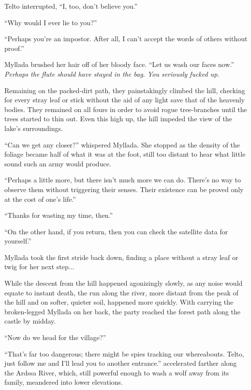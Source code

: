 Telto interrupted, ``I, too, don't believe you.''

``Why would I ever lie to you?''

``Perhaps you're an impostor. After all, I can't accept the words of others without proof.''

Myllada brushed her hair off of her bloody face. ``Let us wash our faces now.'' \emph{Perhaps the flute should have stayed in the bag. You seriously fucked up.}

\centeredstars

Remaining on the packed-dirt path, they painstakingly climbed the hill, checking for every stray leaf or stick without the aid of any light save that of the heavenly bodies. They remained on all fours in order to avoid rogue tree-branches until the trees started to thin out. Even this high up, the hill impeded the view of the lake's surroundings.

``Can we get any closer?'' whispered Myllada. She stopped as the density of the foliage became half of what it was at the foot, still too distant to hear what little sound such an army would produce.

``Perhaps a little more, but there isn't much more we can do. There's no way to observe them without triggering their senses. Their existence can be proved only at the cost of one's life.''

``Thanks for wasting my time, then.''

``On the other hand, if you return, then you can check the satellite data for yourself.''

Myllada took the first stride back down, finding a place without a stray leaf or twig for her next step...

\centeredstars

While the descent from the hill happened agonizingly slowly, as any noise would equate to instant death, the run along the river, more distant from the peak of the hill and on softer, quieter soil, happened more quickly. With \yronsyncra{} carrying the broken-legged Myllada on her back, the party reached the forest path along the castle by midday.

``Now do we head for the village?''

``That's far too dangerous; there might be spies tracking our whereabouts. Telto, just follow me and I'll lead you to another entrance.'' \yronsyncra{} accelerated farther along the Ardssa River, which, still powerful enough to wash a wolf away from its family, meandered into lower elevations.

